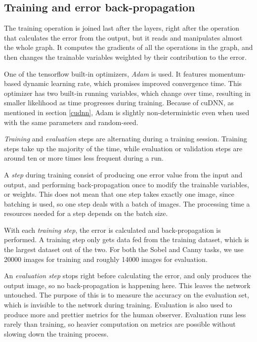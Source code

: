 \documentclass[12pt]{report}
\begin{document}
\subsection{Training and error back-propagation} \label{train}
The training operation is joined last after the layers, right after the operation that calculates the error from the output, but it reads and manipulates almost the whole graph. It computes the gradients of all the operations in the graph, and then changes the trainable variables weighted by their contribution to the error.\par

One of the tensorflow built-in optimizers, \textit{Adam} \cite{adam} is used. It features momentum-based dynamic learning rate, which promises improved convergence time. This optimizer has two built-in running variables, which change over time, resulting in smaller likelihood as time progresses during training. Because of cuDNN, as mentioned in section \ref{cudnn}, Adam is slightly non-deterministic even when used with the same parameters and random-seed.\par

\textit{Training} and \textit{evaluation} steps are alternating during a training session. Training steps take up the majority of the time, while evaluation or validation steps are around ten or more times less frequent during a run.\par

A \textit{step} during training consist of producing one error value from the input and output, and performing back-propagation once to modify the trainable variables, or weights. This does not mean that one step takes exactly one image, since batching is used, so one step deals with a batch of images. The processing time a resources needed for a step depends on the batch size.\par

With each \textit{training step}, the error is calculated and back-propagation is performed. A training step only gets data fed from the training dataset, which is the largest dataset out of the two. For both the Sobel and Canny tasks, we use 20000 images for training and roughly 14000 images for evaluation.\par

An \textit{evaluation step} stops right before calculating the error, and only produces the output image, so no back-propagation is happening here. This leaves the network untouched. The purpose of this is to measure the accuracy on the evaluation set, which is invisible to the network during training. Evaluation is also used to produce more and prettier metrics for the human observer. Evaluation runs less rarely than training, so heavier computation on metrics are possible without slowing down the training process.
\end{document}
